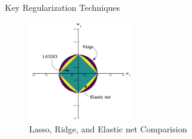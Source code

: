 \documentclass[serif, aspectratio=169]{beamer}
\begin{document}
\begin{frame}{Key Regularization Techniques}

            \begin{figure}
                \includegraphics[width=0.4\textwidth]{pic/Regularization.png}
                 \caption{Lasso, Ridge, and Elastic net Comparision}
                \label{fig:Regularization}
            \end{figure}

\end{frame}
\end{document}
